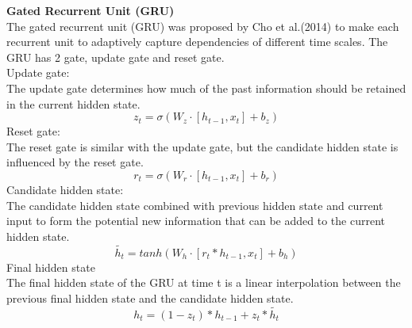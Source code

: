\documentclass[12pt,a4paper]{article}
\begin{document}
\newpage
\textbf{Gated Recurrent Unit (GRU)}
\\[1ex]
The gated recurrent unit (GRU) was proposed by Cho et al.(2014) to make each recurrent unit to adaptively capture dependencies of different time scales. The GRU has 2 gate, update gate and reset gate. 
\\[2ex]
Update gate:
\\[1ex]
The update gate determines how much of the past information should be retained in the current hidden state. 
\begin{equation}
    z_t = \sigma(W_z \cdot [ h_{t-1} , x_t ] + b_z )
\end{equation}
Reset gate:
\\[1ex]
The reset gate is similar with the update gate, but the candidate hidden state is influenced by the reset gate. 
\begin{equation}
    r_t = \sigma( W_r \cdot [ h_{t-1} , x_t ] + b_r )
\end{equation}
Candidate hidden state:
\\[1ex]
The candidate hidden state combined with previous hidden state and current input to form the potential new information that can be added to the current hidden state.
\begin{equation}
    \widetilde{h_t} = tanh ( W_h \cdot [ r_t * h_{t-1} , x_t ] + b_h )
\end{equation}
Final hidden state
\\[1ex]
The final hidden state of the GRU at time t is a linear interpolation between the previous final hidden state and the candidate hidden state. 
\begin{equation}
    h_t = ( 1 - z_t ) * h_{t-1} + z_t * \widetilde{ h_t }
\end{equation}
\end{document}
